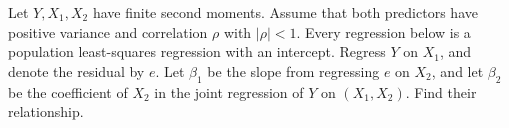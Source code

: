 Let $Y,X_1,X_2$ have finite second moments. Assume that both predictors have positive variance and correlation $\rho$ with $|\rho|<1$. Every regression below is a population least-squares regression with an intercept. Regress $Y$ on $X_1$, and denote the residual by $e$. Let $\beta_1$ be the slope from regressing $e$ on $X_2$, and let $\beta_2$ be the coefficient of $X_2$ in the joint regression of $Y$ on $(X_1,X_2)$. Find their relationship.

